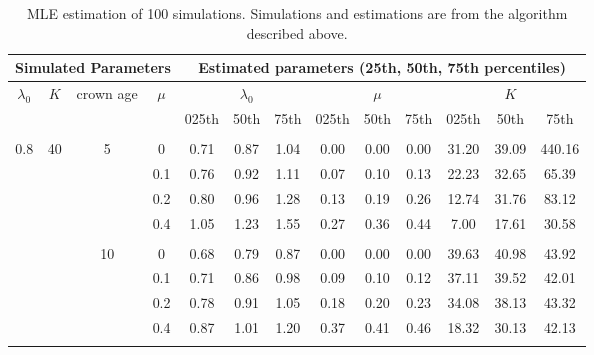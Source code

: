 \documentclass[11pt]{beamer}
\begin{document}
\begin{frame}

\begin{table}[h!]
{\tiny
\centering

\caption{MLE estimation of 100 simulations. Simulations and estimations are from the algorithm described above.}
\label{alg}
\begin{tabular}{cccc|ccc@{\hskip 0.2in}ccc@{\hskip 0.2in}ccc}
\hline
\multicolumn{4}{c}{Simulated Parameters} & \multicolumn{9}{c}{Estimated parameters (25th, 50th, 75th percentiles)} \\ \hline
$\lambda_0$    & $K$     & crown age    & $\mu$    &        & $\lambda_0$  &       &       & $\mu$   &      &       & $K$     &        \\
          &       &              &       & 025th  & 50th    & 75th  & 025th & 50th & 75th & 025th & 50th  & 75th   \\
          &       &              &       &        &         &       &       &      &      &       &       &        \\
0.8       & 40    & 5            & 0     & 0.71   & 0.87    & 1.04  & 0.00  & 0.00 & 0.00 & 31.20 & 39.09 & 440.16 \\
          &       &              & 0.1   & 0.76   & 0.92    & 1.11  & 0.07  & 0.10 & 0.13 & 22.23 & 32.65 & 65.39  \\
          &       &              & 0.2   & 0.80   & 0.96    & 1.28  & 0.13  & 0.19 & 0.26 & 12.74 & 31.76 & 83.12  \\
          &       &              & 0.4   & 1.05   & 1.23    & 1.55  & 0.27  & 0.36 & 0.44 & 7.00  & 17.61 & 30.58  \\
          &       &              &       &        &         &       &       &      &      &       &       &        \\
          &       & 10           & 0     & 0.68   & 0.79    & 0.87  & 0.00  & 0.00 & 0.00 & 39.63 & 40.98 & 43.92  \\
          &       &              & 0.1   & 0.71   & 0.86    & 0.98  & 0.09  & 0.10 & 0.12 & 37.11 & 39.52 & 42.01  \\
          &       &              & 0.2   & 0.78   & 0.91    & 1.05  & 0.18  & 0.20 & 0.23 & 34.08 & 38.13 & 43.32  \\
          &       &              & 0.4   & 0.87   & 1.01    & 1.20  & 0.37  & 0.41 & 0.46 & 18.32 & 30.13 & 42.13  \\
          &       &              &       &        &         &       &       &      &      &       &       &        \\

\end{tabular}}
\end{table}
\end{frame}
\end{document}

